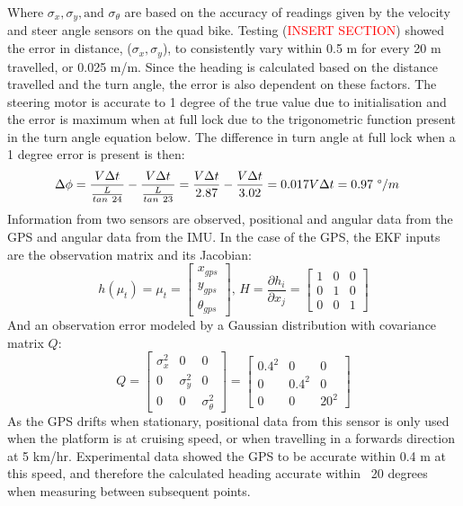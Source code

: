 \documentclass[main.tex]{subfiles}
\begin{document}
Where $\sigma_x, \sigma_y, \textrm{and } \sigma_\theta$ are based on the accuracy of readings given by the velocity and steer angle sensors on the quad bike. Testing (\textcolor{red}{INSERT SECTION}) showed the error in distance, ($\sigma_x, \sigma_y$), to consistently vary within 0.5 m for every 20 m travelled, or 0.025 m/m. Since the heading is calculated based on the distance travelled and the turn angle, the error is also dependent on these factors. The steering motor is accurate to 1 degree of the true value due to initialisation and the error is maximum when at full lock due to the trigonometric function present in the turn angle equation below. The difference in turn angle at full lock when a 1 degree error is present is then:
\begin{align*}
&\Delta\phi = \frac{V\Delta t}{\frac{L}{tan\ 24}} - \frac{V\Delta t}{\frac{L}{tan\ 23}} = \frac{V\Delta t}{2.87} - \frac{V\Delta t}{3.02} = 0.017V\Delta t = 0.97\ \degree/m
\end{align*}
Information from two sensors are observed, positional and angular data from the GPS and angular data from the IMU. In the case of the GPS, the EKF inputs are the observation matrix and its Jacobian:
\[
h(\mu_t) = \mu_t = 
\begin{bmatrix}
    x_{gps}\\
    y_{gps}\\
    \theta_{gps}
\end{bmatrix}
\textrm{, } H = \frac{\partial h_i}{\partial x_j} = 
\begin{bmatrix}
    1	&	0	&	0\\
    0	&	1	&	0\\
    0	&	0	&	1
\end{bmatrix}
\]
And an observation error modeled by a Gaussian distribution with covariance matrix $Q$:
\[
Q = 
\begin{bmatrix}
    \sigma_x^2	&	0	&	0\\
    0	&	\sigma_y^2	&	0\\
    0	&	0	&	\sigma_\theta^2
\end{bmatrix}
=
\begin{bmatrix}
    0.4^2	&	0	&	0\\
    0	&	0.4^2	&	0\\
    0	&	0	&	20^2
\end{bmatrix}
\]
As the GPS drifts when stationary, positional data from this sensor is only used when the platform is at cruising speed, or when travelling in a forwards direction at 5 km/hr. Experimental data showed the GPS to be accurate within 0.4 m at this speed, and therefore the calculated heading accurate within ~20 degrees when measuring between subsequent points. 
\end{document}
